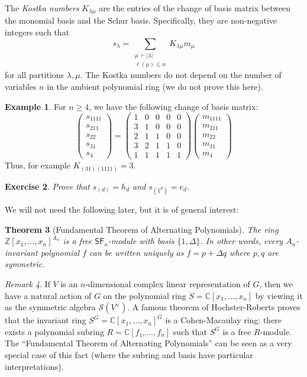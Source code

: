 \documentclass[12pt]{article}
\theoremstyle{plain}
\newtheorem{theorem}{Theorem}[section]
\newtheorem{exercise}[theorem]{Exercise}
\theoremstyle{definition}
\newtheorem{example}[theorem]{Example}
\theoremstyle{remark}
\newtheorem{remark}[theorem]{Remark}
\numberwithin{equation}{section}
\begin{document}
The \emph{Kostka numbers} $K_{\lambda \mu}$ are the entries of the
change of basis matrix between the monomial basis and the Schur basis.
Specifically, they are non-negative integers such that
\[
s_\lambda = \sum_{\substack{\mu\, \vdash |\lambda|\\\ell(\mu) \le n}} K_{\lambda \mu} m_\mu
\]
for all partitions $\lambda,\mu$.  The Kostka numbers do not depend on the number of
variables $n$ in the ambient polynomial ring (we do not prove this here).

\begin{example}
For $n \ge 4$, we have the following change of basis matrix:
\[
\begin{pmatrix}
s_{1111}\\ s_{211} \\ s_{22}\\ s_{31}\\ s_4
\end{pmatrix}
=
\begin{pmatrix}
1 & 0 & 0 & 0 & 0\\
3 & 1 & 0 & 0 & 0\\
2 & 1 & 1 & 0 & 0\\
3 & 2 & 1 & 1 & 0\\
1 & 1 & 1 & 1 & 1
\end{pmatrix} 
\begin{pmatrix}
m_{1111}\\ m_{211} \\ m_{22}\\ m_{31}\\ m_4
\end{pmatrix}
\]
Thus, for example $K_{(31)(1111)}=3$.
\end{example}

\begin{exercise}
Prove that $s_{(d)} = h_d$ and $s_{(1^d)} = e_d$.
\end{exercise}

We will not need the following later, but it is of general interest:

\begin{theorem}[Fundamental Theorem of Alternating Polynomials]
The ring $\mathbb{Z}[x_1,\ldots,x_n]^{A_n}$ is a free
$\mathsf{SF}_n$-module with basis $\{1, \Delta\}$.
In other words, every $A_n$-invariant polynomial $f$ can be written uniquely
as $f=p+\Delta q$ where $p,q$ are symmetric.
\end{theorem}

\begin{remark}
If $V$ is an $n$-dimensional complex linear representation of $G$,
then we have a natural action of $G$ on the polynomial ring
$S=\mathbb{C}[x_1,\ldots,x_n]$ by viewing it as the symmetric algebra
$\mathcal{S}(V^\vee)$.
A famous theorem of Hochster-Roberts proves that the invariant ring
$S^G=\mathbb{C}[x_1,\ldots,x_n]^G$ is a Cohen-Macaulay ring:
there exists a polynomial subring $R=\mathbb{C}[f_1,\ldots,f_n]$
such that $S^G$ is a free $R$-module.
The ``Fundamental Theorem of Alternating Polynomials'' can be seen as a
very special case of this fact (where the subring and basis have
particular interpretations).
\end{remark}
\end{document}
